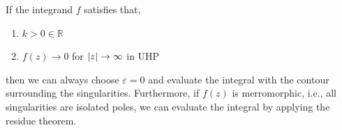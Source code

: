 \documentclass{book}
\begin{document}
If the integrand $f$ satisfies that,
\begin{enumerate}
	\item $k > 0 \in \mathbb{R}$
	\item $f(z) \to 0$ for $\abs{z} \to \infty$ in UHP
\end{enumerate}
then we can always choose $\varepsilon = 0$ and evaluate the integral with the contour surrounding the singularities. Furthermore, if $f(z)$ is merromorphic, i.e., all singularities are isolated poles, we can evaluate the integral by applying the residue theorem. 
\end{document}
